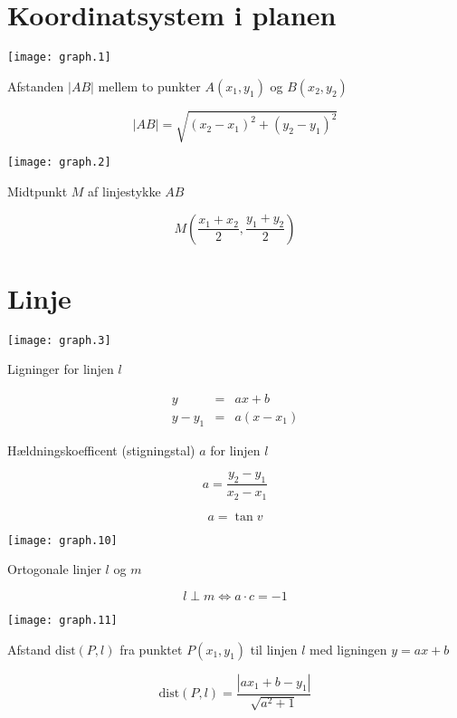 \documentclass[11pt,a4paper,landscape,twocolumn,fleqn,leqno]{article}
\begin{document}
\section{Koordinatsystem i planen}

\texttt{[image: graph.1]}

Afstanden $|AB|$ mellem to punkter $A(x_1,y_1)$ og $B(x_2,y_2)$

\begin{equation}
|AB| = \sqrt{(x_2-x_1)^2 + (y_2-y_1)^2}
\end{equation}

\texttt{[image: graph.2]}

Midtpunkt $M$ af linjestykke $AB$

\begin{equation}
M\left(\frac{x_1+x_2}{2},\frac{y_1+y_2}{2}\right)
\end{equation}

\section{Linje}

\texttt{[image: graph.3]}

Ligninger for linjen $l$

\begin{eqnarray}
y & = & ax+b \\
y-y_1 & = & a(x-x_1) \nonumber
\end{eqnarray}

Hældningskoefficent (stigningstal) $a$ for linjen $l$

\begin{equation}
a = \frac{y_2 - y_1}{x_2 - x_1}
\end{equation}

\begin{equation}
a = \tan v
\end{equation}

\texttt{[image: graph.10]}

Ortogonale linjer $l$ og $m$

\begin{equation}
l \perp m \Leftrightarrow a \cdot c = -1
\end{equation}

\texttt{[image: graph.11]}

Afstand $\text{dist}(P,l)$ fra punktet $P(x_1,y_1)$ til linjen $l$ med ligningen $y = ax+b$

\begin{equation}
\text{dist}(P,l) = \frac{|ax_1 + b - y_1|}{\sqrt{a^2 + 1}}
\end{equation}
\end{document}
